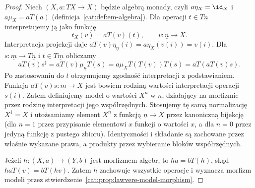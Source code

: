 \begin{proof}
Niech $(X,a:TX\to X)$ będzie algebrą monady, czyli $a\eta_X=\id_X$ i $a\mu_X=aT(a)$ (definicja~\ref{cat:def:em-algebra}). Dla operacji $t\in T\underline n$ interpretujemy ją jako funkcję
\begin{equation}\label{cat:eq:lawvere-eval}
 t_X(v)=aT(v)(t),\qquad v:\underline n\to X.
\end{equation}
Interpretacja projekcji daje $aT(v)\eta_{\underline n}(i)=a\eta_X(v(i))=v(i)$. Dla $s:\underline m\to T\underline n$ i $t\in T\underline m$ obliczamy
\[
 aT(v)s^\sharp
 =aT(v)\mu_{\underline n}T(s)
 =a\mu_X T(T(v))T(s)
 =aT(aT(v)s).
\]
Po zastosowaniu do $t$ otrzymujemy zgodność interpretacji z podstawianiem. Funkcja $aT(v)s:\underline m\to X$ jest bowiem rodziną wartości interpretacji operacji $s(i)$. Zatem definiujemy model o wartości $X^n$ w $n$, działający na morfizmie przez rodzinę interpretacji jego współrzędnych. Stosujemy tę samą normalizację $X^1=X$ i utożsamiamy element $X^n$ z funkcją $\underline n\to X$ przez kanoniczną bijekcję (dla $n=1$ przez przypisanie elementowi $x$ funkcji o wartości $x$, a dla $n=0$ przez jedyną funkcję z pustego zbioru). Identyczności i składanie są zachowane przez właśnie wykazane prawa, a produkty przez wybieranie bloków współrzędnych.

Jeżeli $h:(X,a)\to(Y,b)$ jest morfizmem algebr, to $ha=bT(h)$, skąd $h aT(v)=bT(hv)$. Zatem $h$ zachowuje wszystkie operacje i wyznacza morfizm modeli przez stwierdzenie~\ref{cat:prop:lawvere-model-morphism}.


\end{proof}
